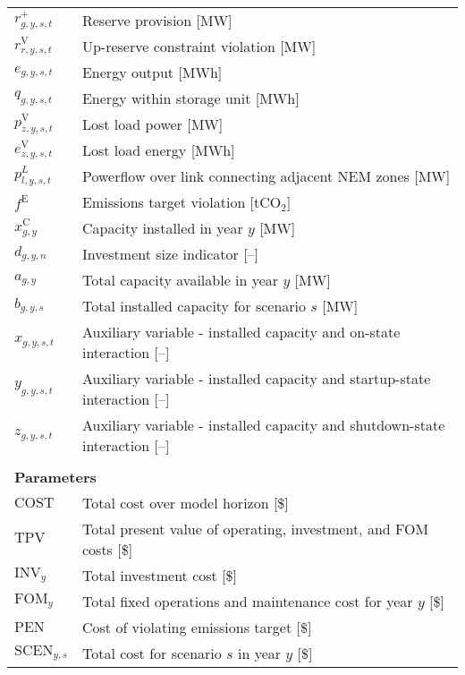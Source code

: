 \documentclass{article}
\newcommand{\sLinks}{L}
\newcommand{\iGenerator}{g}
\newcommand{\iYear}{y}
\newcommand{\iScenario}{s}
\newcommand{\iInterval}{t}
\newcommand{\iZone}{z}
\newcommand{\iRegion}{r}
\newcommand{\iInvestmentSizeOption}{n}
\newcommand{\iLink}{l}
\newcommand{\cFixedOperationsMaintenanceCost}[1][\iYear]{\mathrm{FOM}_{#1}}
\newcommand{\cInvestmentCost}[1][\iYear]{\mathrm{INV}_{#1}}
\newcommand{\cTotalPresentValue}[1][]{\mathrm{TPV}_{#1}}
\newcommand{\cEmissionsViolationTotalCost}{\mathrm{PEN}}
\newcommand{\cObjectiveFunction}{\mathrm{COST}}
\newcommand{\cOperatingCostScenario}[1][\iYear,\iScenario]{\mathrm{SCEN}_{#1}}
\newcommand{\vEnergy}[1][\iGenerator,\iYear,\iScenario,\iInterval]{e_{#1}}
\newcommand{\vInstalledCapacity}[1][\iGenerator,\iYear]{x^{\mathrm{C}}_{#1}}
\newcommand{\vInvestmentSizeIndicator}[1][\iGenerator,\iYear,\iInvestmentSizeOption]{d_{#1}}
\newcommand{\vReserveUp}[1][\iGenerator,\iYear,\iScenario,\iInterval]{r^{+}_{#1}}
\newcommand{\vReserveUpViolation}[1][\iRegion,\iYear,\iScenario,\iInterval]{r^{\mathrm{V}}_{#1}}
\newcommand{\vStorageUnitEnergy}[1][\iGenerator,\iYear,\iScenario,\iInterval]{q_{#1}}
\newcommand{\vPowerFlow}[1][\iLink,\iYear,\iScenario,\iInterval]{p^{\sLinks}_{#1}}
\newcommand{\vLostLoadEnergy}[1][\iZone,\iYear,\iScenario,\iInterval]{e^{\mathrm{V}}_{#1}}
\newcommand{\vLostLoadPower}[1][\iZone,\iYear,\iScenario,\iInterval]{p^{\mathrm{V}}_{#1}}
\newcommand{\vEmissionsTargetViolation}{f^{\mathrm{E}}}
\newcommand{\vInstalledCapacityTotal}[1][\iGenerator,\iYear]{a_{#1}}
\newcommand{\vInstalledCapacityTotalScenario}[1][\iGenerator,\iYear,\iScenario]{b_{#1}}
\newcommand{\vInstalledCapacityOnStateAux}[1][\iGenerator,\iYear,\iScenario,\iInterval]{x_{#1}}
\newcommand{\vInstalledCapacityStartupStateAux}[1][\iGenerator,\iYear,\iScenario,\iInterval]{y_{#1}}
\newcommand{\vInstalledCapacityShutdownStateAux}[1][\iGenerator,\iYear,\iScenario,\iInterval]{z_{#1}}
\begin{document}
\begin{longtable}{ p{}  p{}}
	$\vReserveUp$ & Reserve provision [MW]\\
	$\vReserveUpViolation$ & Up-reserve constraint violation [MW]\\
	
	$\vEnergy$ & Energy output [MWh]\\
	$\vStorageUnitEnergy$ & Energy within storage unit [MWh]\\

	$\vLostLoadPower$ & Lost load power [MW]\\
	$\vLostLoadEnergy$ & Lost load energy [MWh]\\
	$\vPowerFlow$ & Powerflow over link connecting adjacent NEM zones [MW]\\
	$\vEmissionsTargetViolation$ & Emissions target violation [tCO$_{2}$]\\
	$\vInstalledCapacity$ & Capacity installed in year $\iYear$ [MW]\\
	$\vInvestmentSizeIndicator$ & Investment size indicator [--]\\
	$\vInstalledCapacityTotal$ & Total capacity available in year $\iYear$ [MW]\\
	$\vInstalledCapacityTotalScenario$ & Total installed capacity for scenario $\iScenario$ [MW]\\
	$\vInstalledCapacityOnStateAux$ & Auxiliary variable - installed capacity and on-state interaction [--]\\
	$\vInstalledCapacityStartupStateAux$ & Auxiliary variable - installed capacity and startup-state interaction [--]\\
	$\vInstalledCapacityShutdownStateAux$ & Auxiliary variable - installed capacity and shutdown-state interaction [--]\\
	& \\
	\multicolumn{2}{l}{\textbf{Parameters}}\\
	$\cObjectiveFunction$ & Total cost over model horizon [\$]\\
	$\cTotalPresentValue$ & Total present value of operating, investment, and FOM costs [\$]\\
	$\cInvestmentCost$ & Total investment cost [\$]\\
	$\cFixedOperationsMaintenanceCost$ & Total fixed operations and maintenance cost for year $\iYear$ [\$]\\
	$\cEmissionsViolationTotalCost$ & Cost of violating emissions target [\$]\\
	$\cOperatingCostScenario$ & Total cost for scenario $\iScenario$ in year $\iYear$ [\$]\\

\end{longtable}
\end{document}
